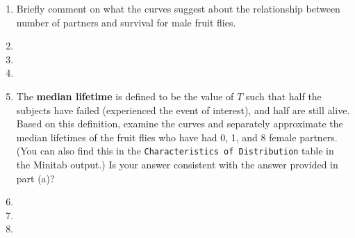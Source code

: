 \begin{enumerate}
\begin{enumerate}
\item Briefly comment on what the curves suggest about the relationship between number of partners and survival for male fruit
flies.
\item[]
\item[]
\item[]
\item The \textbf{median lifetime} is defined to be the value of $T$ such that half the subjects have failed (experienced the event of interest), and half are still alive.  Based on this definition, examine the curves and separately approximate the median lifetimes of the fruit flies who have had 0, 1, and 8 female partners. (You can also find this in the \texttt{Characteristics of Distribution} table in the Minitab output.) Is your answer consistent with the answer provided in part (a)?
\item[]
\item[]
\item[]
\end{enumerate}
\end{enumerate}


